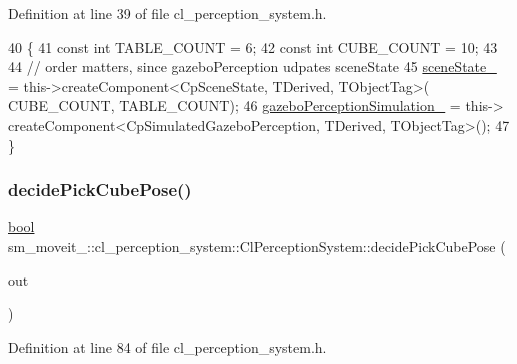 Definition at line 39 of file cl\+\_\+perception\+\_\+system.\+h.


\begin{DoxyCode}
40             \{
41                 \textcolor{keyword}{const} \textcolor{keywordtype}{int} TABLE\_COUNT = 6;
42                 \textcolor{keyword}{const} \textcolor{keywordtype}{int} CUBE\_COUNT = 10;
43 
44                 \textcolor{comment}{// order matters, since gazeboPerception udpates sceneState}
45                 \hyperlink{classsm__moveit__4_1_1cl__perception__system_1_1ClPerceptionSystem_a82ea8feeb2fa43349f91ed59137b3890}{sceneState\_} = this->createComponent<CpSceneState, TDerived, TObjectTag>(
      CUBE\_COUNT, TABLE\_COUNT);
46                 \hyperlink{classsm__moveit__4_1_1cl__perception__system_1_1ClPerceptionSystem_a027c07df3f1a2cc0c30be111b27dbe5c}{gazeboPerceptionSimulation\_} = this->
      createComponent<CpSimulatedGazeboPerception, TDerived, TObjectTag>();
47             \}
\end{DoxyCode}
\mbox{\label{classsm__moveit__4_1_1cl__perception__system_1_1ClPerceptionSystem_af1143d68db667021480383673244bb04}} 
\subsubsection{\texorpdfstring{decide\+Pick\+Cube\+Pose()}{decidePickCubePose()}}
{\footnotesize\ttfamily \hyperlink{classbool}{bool} sm\+\_\+moveit\+\_\+::cl\+\_\+perception\+\_\+system\+::\+Cl\+Perception\+System\+::decide\+Pick\+Cube\+Pose (\begin{DoxyParamCaption}\item[{geometry\+\_\+msgs\+::\+Pose\+Stamped \&}]{out }\end{DoxyParamCaption})\hspace{0.3cm}{\ttfamily [inline]}}



Definition at line 84 of file cl\+\_\+perception\+\_\+system.\+h.


